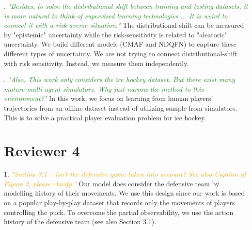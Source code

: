 \documentclass{article}
\begin{document}
. \textcolor{ForestGreen}{\it "Besides, to solve the distributional shift between training and testing datasets, it is more natural to think of supervised learning technologies ... It is weird to connect it with a risk-averse situation."}
The distributional-shift can be measured by "epistemic" uncertainty while the risk-sensitivity is related to "aleatoric" uncertainty. We build different models (CMAF and NDQFN) to capture these different types of uncertainty.  We are not trying to connect distributional-shift with risk sensitivity. Instead, we measure them independently.

. \textcolor{ForestGreen}{\it "Also, This work only considers the ice hockey dataset. But there exist many mature multi-agent simulators. Why just narrow the method to this environment?"}
In this work, we focus on learning from human players' trajectories from an offline dataset instead of utilizing sample from simulators. This is to solve a practical player evaluation problem for ice hockey.


\vspace{-0.1in}
\section*{Reviewer 4}
1. \textcolor{orange}{\it "Section 3.1 – isn’t the defensive game taken into account? See also Caption of Figure 2, please clarify."}
Our model does consider the defensive team by modelling history of their movements. We use this design since our work is based on a popular play-by-play dataset that records only the movements of players controlling the puck. To overcome the partial observability, we use the action history of the defensive team (see also Section 3.1). 
\end{document}
